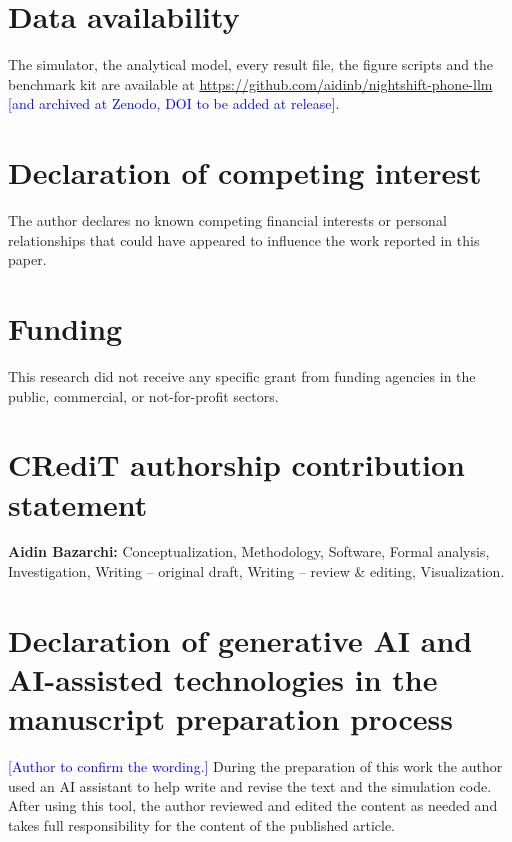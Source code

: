 \documentclass[preprint,review,12pt,authoryear]{elsarticle}
\newcommand{\Pending}[1]{\textcolor{blue}{[#1]}}
\begin{document}
\section*{Data availability}
The simulator, the analytical model, every result file, the figure scripts and
the benchmark kit are available at
\url{https://github.com/aidinb/nightshift-phone-llm} \Pending{and archived at
Zenodo, DOI to be added at release}.

\section*{Declaration of competing interest}
The author declares no known competing financial interests or personal
relationships that could have appeared to influence the work reported in this
paper.

\section*{Funding}
This research did not receive any specific grant from funding agencies in the
public, commercial, or not-for-profit sectors.

\section*{CRediT authorship contribution statement}
\textbf{Aidin Bazarchi:} Conceptualization, Methodology, Software, Formal
analysis, Investigation, Writing -- original draft, Writing -- review \&
editing, Visualization.

\section*{Declaration of generative AI and AI-assisted technologies in the manuscript preparation process}
\Pending{Author to confirm the wording.} During the preparation of this work
the author used an AI assistant to help write and revise the text and the
simulation code. After using this tool, the author reviewed and edited the
content as needed and takes full responsibility for the content of the
published article.



\end{document}
